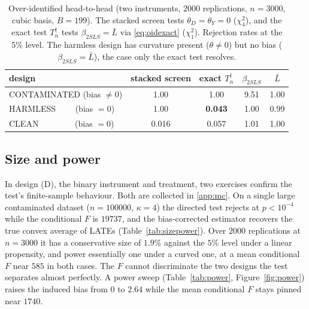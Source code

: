 \documentclass[preprint,11pt,authoryear]{elsarticle}
\theoremstyle{definition}
\begin{document}
\begin{table}[t]\centering
\caption{Over-identified head-to-head (two instruments, $\num{2000}$ replications, $n=3000$,
cubic basis, $B=199$). The stacked screen tests $\theta_D=\theta_Y=0$ ($\chi^2_4$), and the
exact test $T_n^{\dagger}$ tests $\beta_{2SLS}=\bar L$ via \eqref{eq:oidexact} ($\chi^2_1$).
Rejection rates at the $5\%$ level. The harmless design has curvature present
($\theta\neq0$) but no bias ($\beta_{2SLS}=\bar L$), the case only the exact test resolves.}
\label{tab:overid}
\begin{tabular}{lcccc}
\toprule
design & stacked screen & exact $T_n^{\dagger}$ & $\beta_{2SLS}$ & $\bar L$\\
\midrule
CONTAMINATED (bias $\neq0$)     & 1.00  & 1.00           & 9.51 & 1.00\\
HARMLESS \ \ \ \ (bias $=0$)    & 1.00  & \textbf{0.043} & 1.00 & 0.99\\
CLEAN \ \ \ \ \ \ \ \ (bias $=0$) & 0.016 & 0.057        & 1.01 & 1.00\\
\bottomrule
\end{tabular}
\end{table}

\subsection{Size and power}
In design (D), the binary instrument and treatment, two exercises confirm the test's
finite-sample behaviour. Both are collected in \ref{app:mc}. On a single large contaminated dataset ($n=\num{100000}$,
$\kappa=4$) the directed test rejects at $p<10^{-4}$ while the conditional $F$ is
$\num{19737}$, and the bias-corrected estimator recovers the true convex average of LATEs (Table~\ref{tab:sizepower}). Over $\num{2000}$ replications at $n=3000$ it has a
conservative size of $1.9\%$ against the $5\%$ level under a linear propensity, and
power essentially one under a curved one, at
a mean conditional $F$ near $585$ in both cases. The $F$ cannot discriminate
the two designs the test separates almost perfectly. A power sweep
(Table~\ref{tab:power}, Figure~\ref{fig:power}) raises the induced bias from $0$ to
$2.64$ while the mean conditional $F$ stays pinned near $\num{1740}$.
\end{document}
